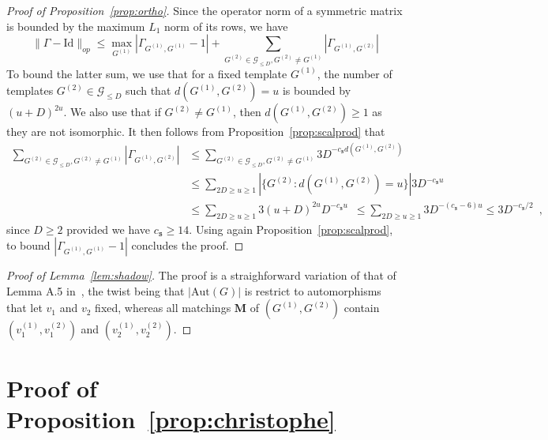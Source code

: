 \documentclass[final]{colt2026}
\newcommand{\1}{\mathbf{1}}
\begin{document}
\begin{proof}[Proof of Proposition~\ref{prop:ortho}]
Since the operator norm of a symmetric matrix is bounded by the maximum $L_1$ norm of its rows, we have 
\[
\|\Gamma - \mathrm{Id}\|_{op}\leq \max_{G^{(1)}}\left|\Gamma_{G^{(1)}, G^{(1)}}-1\right|+  \sum_{G^{(2)} \in \mathcal G_{\leq D}, G^{(2)} \neq G^{(1)} }\left|\Gamma_{G^{(1)}, G^{(2)}}\right|
\] 
To bound the latter sum, we use that for a fixed template $G^{(1)}$, the number of templates $G^{(2)}\in \mathcal{G}_{\leq D}$ such that $d( G^{(1)}, G^{(2)}) = u$ is bounded by $(u+D)^{2u}$. 
We also use that if $G^{(2)} \neq G^{(1)}$, then $d(G^{(1)}, G^{(2)})\geq 1$ as they are not isomorphic. It then follows from Proposition~\ref{prop:scalprod} that
\begin{align*}
    \sum_{G^{(2)} \in \mathcal G_{\leq D}, G^{(2)} \neq G^{(1)} }\left|\Gamma_{G^{(1)}, G^{(2)}}\right|
    &\leq \sum_{G^{(2)} \in \mathcal G_{\leq D}, G^{(2)} \neq G^{(1)}} 3D^{-c_{\texttt{s}}d(G^{(1)},G^{(2)})} \\
    &\leq \sum_{2D \geq  u \geq 1} |\{G^{(2)}: d( G^{(1)}, G^{(2)}) = u \}|  3D^{-c_{\texttt{s}}u}\enspace\\
    &\leq \sum_{2D \geq u\geq 1} 3(u+D)^{2u}  D^{-c_{\texttt{s}}u}\enspace
    \leq \sum_{2D \geq u\geq 1} 3D^{-(c_{\texttt{s}}-6)u} \leq  3D^{-c_{\texttt{s}}/2}\enspace ,
\end{align*}
since $D \geq 2$ provided we have $c_{\texttt{s}} \geq 14$. 
Using again  Proposition~\ref{prop:scalprod}, to bound $\left|\Gamma_{G^{(1)}, G^{(1)}}-1\right|$  concludes the proof.
\end{proof}




\begin{proof}[Proof of Lemma~\ref{lem:shadow}] 
The proof is a straighforward variation of that of Lemma A.5 in~\cite{CGGV25}, the twist being that $|\mathrm{Aut}(G)|$ is restrict to automorphisms that let $v_1$ and $v_2$ fixed, whereas all matchings $\mathbf{M}$ of $(G^{(1)},G^{(2)})$ contain $(v_1^{(1)},v_1^{(2)})$ and $(v_2^{(1)},v_2^{(2)})$.  
\end{proof}




\section{Proof of Proposition~\ref{prop:christophe}}
\end{document}
